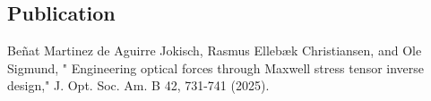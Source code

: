 \vspace*{0.4\textheight}
\begin{center}
  \begin{minipage}{0.9\linewidth}
    \section*{Publication \cite{ownpub2}}
    Beñat Martinez de Aguirre Jokisch, Rasmus Ellebæk Christiansen, and Ole Sigmund, "
    Engineering optical forces through Maxwell stress tensor inverse design,"  J. Opt. Soc. Am. B 42, 731-741 (2025).
  \end{minipage}
\end{center}
\newpage


%

